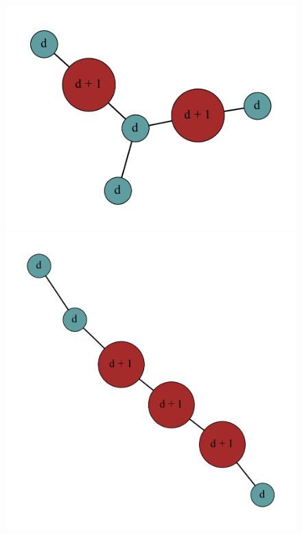 \documentclass[12pt]{article}
\theoremstyle{plain}
\theoremstyle{definition}
\theoremstyle{remark}
\begin{document}
\begin{figure}[htb]
					\includegraphics[scale=0.25]{Superabundance/MaxDegree3Trees/001010011001000[3,3,1,1,1,3].pdf}
					\includegraphics[scale=0.25]{Superabundance/MaxDegree3Trees/001010011010000[2,3,1,1,3,3].pdf}

\end{figure}
\end{document}
